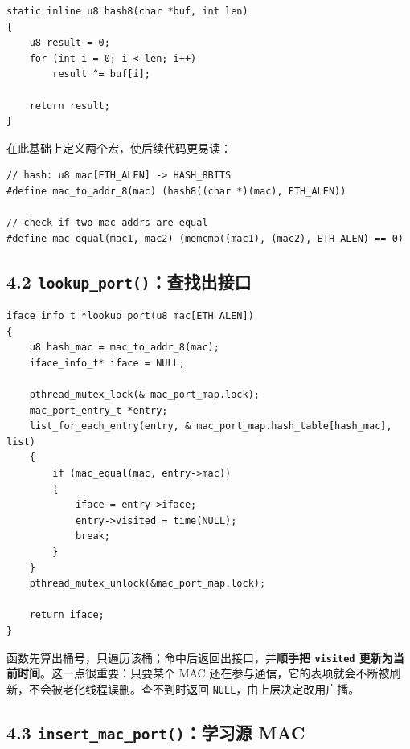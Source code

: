 \documentclass[UTF8,12pt,a4paper,fontset=fandol]{ctexart}
\begin{document}
\begin{verbatim}
static inline u8 hash8(char *buf, int len)
{
    u8 result = 0;
    for (int i = 0; i < len; i++)
        result ^= buf[i];

    return result;
}
\end{verbatim}

在此基础上定义两个宏，使后续代码更易读：

\begin{verbatim}
// hash: u8 mac[ETH_ALEN] -> HASH_8BITS
#define mac_to_addr_8(mac) (hash8((char *)(mac), ETH_ALEN))

// check if two mac addrs are equal
#define mac_equal(mac1, mac2) (memcmp((mac1), (mac2), ETH_ALEN) == 0)
\end{verbatim}

\subsection*{4.2 \texttt{lookup_port()}：查找出接口}

\begin{verbatim}
iface_info_t *lookup_port(u8 mac[ETH_ALEN])
{
    u8 hash_mac = mac_to_addr_8(mac);
    iface_info_t* iface = NULL;

    pthread_mutex_lock(& mac_port_map.lock);
    mac_port_entry_t *entry;
    list_for_each_entry(entry, & mac_port_map.hash_table[hash_mac], list)
    {
        if (mac_equal(mac, entry->mac)) 
        {
            iface = entry->iface;
            entry->visited = time(NULL);
            break;
        }
    }
    pthread_mutex_unlock(&mac_port_map.lock);

    return iface;
}
\end{verbatim}

函数先算出桶号，只遍历该桶；命中后返回出接口，并\textbf{顺手把 \texttt{visited} 更新为当前时间}。这一点很重要：只要某个 MAC 还在参与通信，它的表项就会不断被刷新，不会被老化线程误删。查不到时返回 \texttt{NULL}，由上层决定改用广播。

\subsection*{4.3 \texttt{insert_mac_port()}：学习源 MAC}
\end{document}
